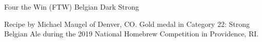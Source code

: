 \begin{recipe}{Four the Win (FTW) Belgian Dark Strong}

\begin{aboutblock}
Recipe by Michael Maugel of Denver, CO. Gold medal in Category 22: Strong
Belgian Ale during the 2019 National Homebrew Competition in Providence, RI.
\sourceaha
\end{aboutblock}


\begin{methodandtiming}
 
\begin{mashsteps}
\end{mashsteps}

\begin{fermentationsteps}
\end{fermentationsteps}

\end{methodandtiming}

\recipebreak

\begin{ingredientsblock}

\begin{malts}
\end{malts}

\begin{hops}
\end{hops}


\end{ingredientsblock}

\end{recipe}

